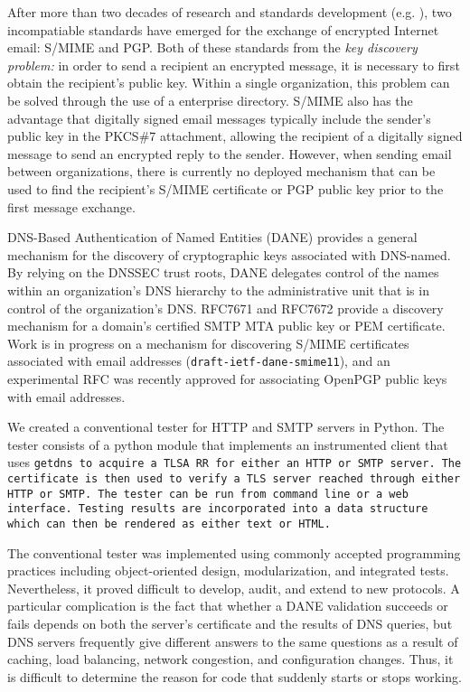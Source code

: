 \documentclass[preprint,5p]{elsarticle}
\begin{document}
After more than two decades of research and standards development
(e.g. \cite{rfc1421,rfc4880,rfc5750}), two incompatiable standards
have emerged for the exchange of encrypted Internet email: S/MIME and
PGP. Both of these standards from the \emph{key discovery problem:} in
order to send a recipient an encrypted message, it is necessary to
first obtain the recipient's public key. Within a single organization,
this problem can be solved through the use of a enterprise
directory. S/MIME also has the advantage that digitally signed email
messages typically include the sender's public key in the PKCS\#7
attachment\cite{rfc2315}, allowing the recipient of a digitally signed
message to send an encrypted reply to the sender. However, when
sending email between organizations, there is currently no deployed
mechanism that can be used to find the recipient's S/MIME certificate
or PGP public key prior to the first message exchange.

DNS-Based Authentication of Named
Entities\cite{rfc7671} (DANE) provides a general mechanism for the
discovery of cryptographic keys associated with DNS-named. By relying
on the DNSSEC\cite{rfc3833} trust roots, DANE delegates control of the
names within an organization's DNS hierarchy to the administrative
unit that is in control of the organization's DNS. RFC7671 and RFC7672 provide a
discovery mechanism for a domain's certified SMTP MTA public key or
PEM certificate\cite{rfc7671,rfc7672}. Work is in progress on a mechanism for discovering
S/MIME certificates associated with email addresses
(\texttt{draft-ietf-dane-smime11}), and 
an experimental RFC was recently approved for associating OpenPGP public keys with email addresses\cite{rfc7929}.

We created a conventional tester for HTTP and SMTP servers in
Python. The tester consists of a python module that implements an
instrumented client that uses \tt{getdns}\cite{getdns} to acquire a TLSA RR for either
an HTTP or SMTP server. The certificate is then used to verify a TLS
server reached through either HTTP or SMTP. The tester can be run from
command line or a web interface. Testing results are incorporated into
a data structure which can then be rendered as either text or HTML.

The conventional tester was implemented using commonly accepted
programming practices including object-oriented design,
modularization, and integrated tests. Nevertheless, it proved
difficult to develop, audit, and extend to new protocols. A particular
complication is the fact that whether a DANE validation succeeds or
fails depends on both the server's certificate and the results of DNS
queries, but DNS servers frequently give different answers to the same
questions as a result of caching, load balancing, network congestion,
and configuration changes. Thus, it is difficult to determine the
reason for code that suddenly starts or stops working.
\end{document}
